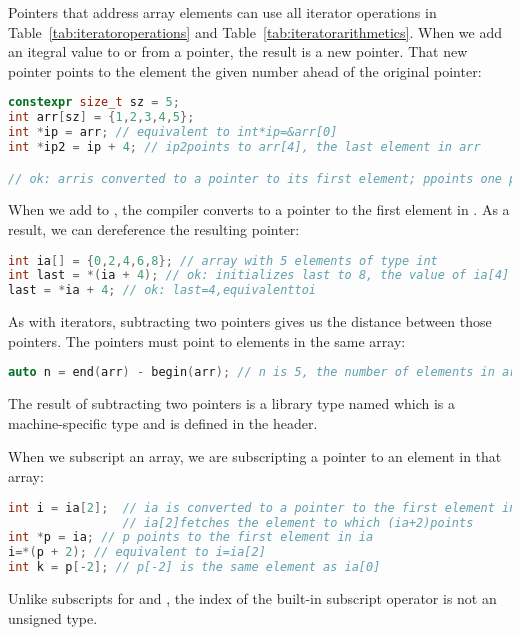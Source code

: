 Pointers that address array elements can use all iterator operations in Table~\ref{tab:iteratoroperations} and Table~\ref{tab:iteratorarithmetics}. When we add an itegral value to or from a pointer, the result is a new pointer. That new pointer points to the element the given number ahead of the original pointer:
\begin{lstlisting}[language=C++]
constexpr size_t sz = 5; 
int arr[sz] = {1,2,3,4,5}; 
int *ip = arr; // equivalent to int*ip=&arr[0] 
int *ip2 = ip + 4; // ip2points to arr[4], the last element in arr

// ok: arris converted to a pointer to its first element; ppoints one past the end of arr int *p = arr + sz; // use caution -- do not dereference! int *p2 = arr + 10; // error: arrhas only 5 elements; p2has undefined value
\end{lstlisting}
When we add  to , the compiler converts  to a pointer to the first element in . As a result, we can dereference the resulting pointer:
\begin{lstlisting}[language=C++]
int ia[] = {0,2,4,6,8}; // array with 5 elements of type int 
int last = *(ia + 4); // ok: initializes last to 8, the value of ia[4]
last = *ia + 4; // ok: last=4,equivalenttoi
\end{lstlisting}

As with iterators, subtracting two pointers gives us the distance between those pointers. The pointers must point to elements in the same array:
\begin{lstlisting}[language=C++]
auto n = end(arr) - begin(arr); // n is 5, the number of elements in arr
\end{lstlisting}
The result of subtracting two pointers is a library type named  which is a machine-specific type and is defined in the  header.

When we subscript an array, we are subscripting a pointer to an element in that array:
\begin{lstlisting}[language=C++]
int i = ia[2];  // ia is converted to a pointer to the first element in ia 
                // ia[2]fetches the element to which (ia+2)points 
int *p = ia; // p points to the first element in ia 
i=*(p + 2); // equivalent to i=ia[2]
int k = p[-2]; // p[-2] is the same element as ia[0]
\end{lstlisting}
Unlike subscripts for  and , the index of the built-in subscript operator is not an unsigned type.

